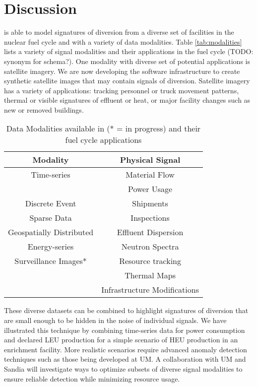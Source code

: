 \section{Discussion}
\label{s_dis}

\Cyclus is able to model signatures of diversion from a diverse set of facilities in the nuclear fuel cycle and with a variety of data modalities. Table \ref{tab:modalities} lists a variety of signal modalities and their applications in the fuel cycle (TODO: synonym for schema?).  One modality with diverse set of potential applications is satellite imagery.  We are now developing the software infrastructure to create synthetic satellite images that may contain signals of diversion. Satellite imagery has a variety of applications: tracking personnel or truck movement patterns, thermal or visible signatures of effluent or heat, or major facility changes such as new or removed buildings.

\begin{table}
\centering
\begin{tabular}{|c|c|}
\hline
\textbf{Modality}        & \textbf{Physical Signal} \\
\hline
Time-series              & Material Flow \\
                         & Power Usage \\
\hline
Discrete Event           & Shipments \\
\hline
Sparse Data              & Inspections \\
\hline
Geospatially Distributed & Effluent Dispersion  \\
\hline
Energy-series            & Neutron Spectra \\
\hline
Surveillance Images*     & Resource tracking \\
                         & Thermal Maps  \\
                         & Infrastructure Modifications \\
\hline
\end{tabular}
\caption{Data Modalities available in \Cyclus (* = in progress) and their fuel cycle applications}
\label{tab:sim_params}
\end{table}

These diverse datasets can be combined to highlight signatures of diversion that are small enough to be hidden in the noise of individual signals.  We have illustrated this technique by combining time-series data for power consumption and declared \gls{LEU} production for a simple scenario of \gls{HEU} production in an enrichment facility.  More realistic scenarios require advanced anomaly detection techniques such as those being developed at \gls{UM}. A collaboration with \gls{UM} and \gls{Sandia} will investigate ways to optimize subsets of diverse signal modalities to ensure reliable detection while minimizing resource usage.

